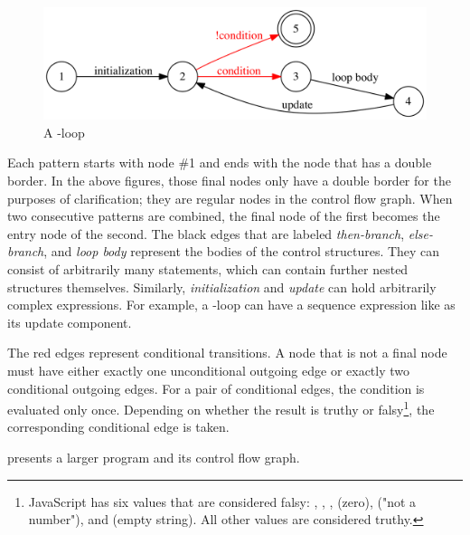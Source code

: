 \begin{figure}[h]
  \centering
  \includegraphics[width=\textwidth]{sections/algorithm/images/for}
  \caption{A -loop}
\end{figure}

Each pattern starts with node \#1 and ends with the node that has a double border. In the above figures, those final nodes only have a double border for the purposes of clarification; they are regular nodes in the control flow graph. When two consecutive patterns are combined, the final node of the first becomes the entry node of the second. The black edges that are labeled \emph{then-branch}, \emph{else-branch}, and \emph{loop body} represent the bodies of the control structures. They can consist of arbitrarily many statements, which can contain further nested structures themselves. Similarly, \emph{initialization} and \emph{update} can hold arbitrarily complex expressions. For example, a -loop can have a sequence expression like  as its update component.

The red edges represent conditional transitions. A node that is not a final node must have either exactly one unconditional outgoing edge or exactly two conditional outgoing edges. For a pair of conditional edges, the condition is evaluated only once. Depending on whether the result is truthy or falsy\footnote{JavaScript has six values that are considered falsy: , , ,  (zero),  ("not a number"), and  (empty string). All other values are considered truthy.}, the corresponding conditional edge is taken.

 presents a larger program and its control flow graph.
